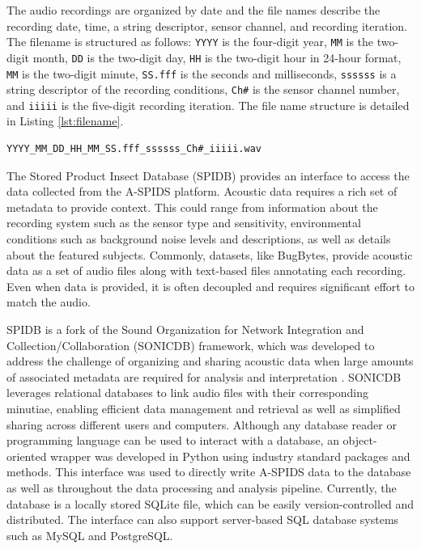 The audio recordings are organized by date and the file names describe the recording date, time, a string descriptor, sensor channel, and recording iteration. The filename is structured as follows: \texttt{YYYY} is the four-digit year, \texttt{MM} is the two-digit month, \texttt{DD} is the two-digit day, \texttt{HH} is the two-digit hour in 24-hour format, \texttt{MM} is the two-digit minute, \texttt{SS.fff} is the seconds and milliseconds, \texttt{ssssss} is a string descriptor of the recording conditions, \texttt{Ch\#} is the sensor channel number, and \texttt{iiiii} is the five-digit recording iteration. The file name structure is detailed in Listing \ref{lst:filename}. 

\begin{listing}[htbp]
	\caption{File organization of the Stored Product Insect Dataset \label{lst:filename}}
	\begin{verbatim}
YYYY_MM_DD_HH_MM_SS.fff_ssssss_Ch#_iiiii.wav
	\end{verbatim}
\end{listing}

The Stored Product Insect Database (SPIDB) provides an interface to access the data collected from the A-SPIDS platform. Acoustic data requires a rich set of metadata to provide context. This could range from information about the recording system such as the sensor type and sensitivity, environmental conditions such as background noise levels and descriptions, as well as details about the featured subjects. Commonly, datasets, like BugBytes, provide acoustic data as a set of audio files along with text-based files annotating each recording. Even when data is provided, it is often decoupled and requires significant effort to match the audio.

\newpage
SPIDB is a fork of the Sound Organization for Network Integration and Collection/Collaboration (SONICDB) framework, which was developed to address the challenge of organizing and sharing acoustic data when large amounts of associated metadata are required for analysis and interpretation \cite{rochManagementAcousticMetadata2016}. SONICDB leverages relational databases to link audio files with their corresponding minutiae, enabling efficient data management and retrieval as well as simplified sharing across different users and computers. Although any database reader or programming language can be used to interact with a database, an object-oriented wrapper was developed in Python using industry standard packages and methods. This interface was used to directly write A-SPIDS data to the database as well as throughout the data processing and analysis pipeline. Currently, the database is a locally stored SQLite file, which can be easily version-controlled and distributed. The interface can also support server-based SQL database systems such as MySQL and PostgreSQL.

